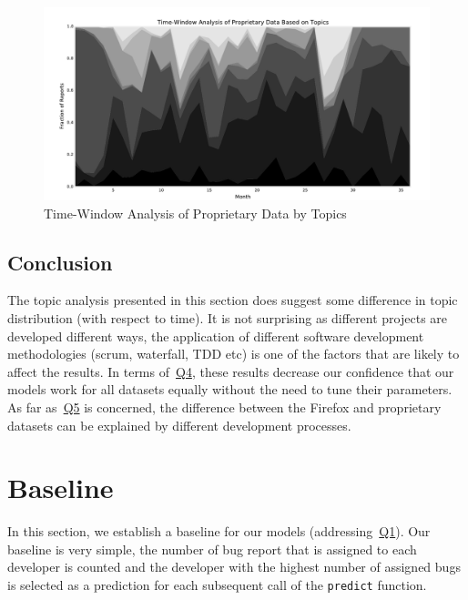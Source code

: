 \begin{figure}[htbp]
    \centering
        \includegraphics[width=\textwidth]{./images/topic_component_distribution/proprietary_topic_10.pdf}
    \caption{Time-Window Analysis of Proprietary Data by Topics}
    \label{fig:distribution.prop.topic}
\end{figure}

\subsection{Conclusion}

The topic analysis presented in this section does suggest some difference in topic distribution (with respect to time). It is not surprising as different projects are developed different ways, the application of different software development methodologies (scrum, waterfall, TDD etc) is one of the factors that are likely to affect the results. In terms of~\hyperlink{question:4}{Q4}, these results decrease our confidence that our models work for all datasets equally without the need to tune their parameters. As far as~\hyperlink{question:5}{Q5} is concerned, the difference between the Firefox and proprietary datasets can be explained by different development processes.

\section{Baseline}
\label{section:baseline}

In this section, we establish a baseline for our models (addressing~\hyperlink{question:1}{Q1}). Our baseline is very simple, the number of bug report that is assigned to each developer is counted and the developer with the highest number of assigned bugs is selected as a prediction for each subsequent call of the \texttt{predict} function.

